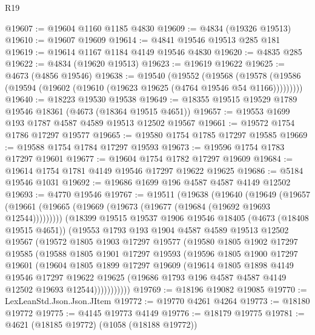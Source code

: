 \begin{lexlean}{R19}
\begin{coremodule}
@19607 := @19604 @1160 @1185 @4830
@19609 := @4834 (@19326 @19513)
@19610 := @19607 @19609
@19614 := @4841 @19546 @19513 @285 @181
@19619 := @19614 @1167 @1184 @4149 @19546 @4830
@19620 := @4835 @285
@19622 := @4834 (@19620 @19513)
@19623 := @19619 @19622
@19625 := @4673 (@4856 @19546)
@19638 := @19540
    (@19552
      (@19568
        (@19578 (@19586 (@19594 (@19602 (@19610 (@19623 @19625 (@4764 @19546 @54 @1166)))))))))
@19640 := @18223 @19530 @19538
@19649 := @18355 @19515 @19529 @1789 @19546 @18361 (@4673 (@18364 @19515 @4651))
@19657 := @19553 @1699 @193 @1787 @4587 @4589 @19513 @12502 @19567
@19661 := @19572 @1754 @1786 @17297 @19577
@19665 := @19580 @1754 @1785 @17297 @19585
@19669 := @19588 @1754 @1784 @17297 @19593
@19673 := @19596 @1754 @1783 @17297 @19601
@19677 := @19604 @1754 @1782 @17297 @19609
@19684 := @19614 @1754 @1781 @4149 @19546 @17297 @19622 @19625
@19686 := @5184 @19546 @1031
@19692 := @19686 @1699 @196 @4587 @4587 @4149 @12502
@19693 := @4770 @19546
@19767 := @19511
    (@19638
      (@19640
        (@19649
          (@19657 (@19661 (@19665 (@19669 (@19673 (@19677 (@19684 (@19692 @19693 @12544)))))))))
        (@18399
          @19515
          @19537
          @1906
          @19546
          @18405
          (@4673 (@18408 @19515 @4651))
          (@19553
            @1793
            @193
            @1904
            @4587
            @4589
            @19513
            @12502
            @19567
            (@19572
              @1805
              @1903
              @17297
              @19577
              (@19580
                @1805
                @1902
                @17297
                @19585
                (@19588
                  @1805
                  @1901
                  @17297
                  @19593
                  (@19596
                    @1805
                    @1900
                    @17297
                    @19601
                    (@19604
                      @1805
                      @1899
                      @17297
                      @19609
                      (@19614
                        @1805
                        @1898
                        @4149
                        @19546
                        @17297
                        @19622
                        @19625
                        (@19686 @1793 @196 @4587 @4587 @4149 @12502 @19693 @12544)))))))))))
@19769 := @18196 @19082 @19085
@19770 := LexLeanStd.Json.Json.JItem
@19772 := @19770 @4261 @4264
@19773 := @18180 @19772
@19775 := @4145 @19773 @4149
@19776 := @18179 @19775
@19781 := @4621 (@18185 @19772) (@1058 (@18188 @19772))

\end{coremodule}
\end{lexlean}
